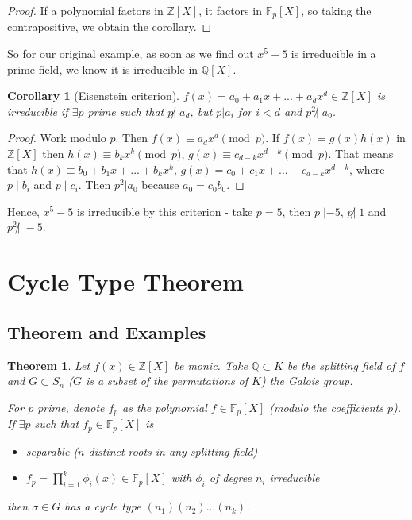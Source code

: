 \documentclass{article}
\theoremstyle{definition}
\theoremstyle{plain}%
\newtheorem{thm}{Theorem}[section]
\newtheorem*{cor}{Corollary}
\theoremstyle{remark}
\newcommand{\Q}{\mathbb{Q}}
\newcommand{\Z}{\mathbb{Z}}
\newcommand{\F}{\mathbb{F}}
\begin{document}
\begin{proof}
    If a polynomial factors in $\Z[X]$, it factors in $\F_p[X]$, so taking the contrapositive, we obtain the corollary.
\end{proof}

So for our original example, as soon as we find out $x^5 - 5$ is irreducible in a prime field, we know it is irreducible in $\Q[X]$.

\begin{cor}[Eisenstein criterion]
    $f(x) = a_0 + a_1 x + ... + a_d x^d \in \Z[X]$ is irreducible if $\exists p$ prime such that $p \not | \; a_d$, but $p | a_i$ for $i < d$ and $p^2 \not | \; a_0$.
\end{cor}

\begin{proof}
    Work modulo $p$. Then $f(x) \equiv a_d x^d \pmod p$. If $f(x) = g(x)h(x)$ in $\Z[X]$ then $h(x) \equiv b_kx^k \pmod p$, $g(x) \equiv c_{d-k} x^{d-k} \pmod p$. That means that $h(x) \equiv b_0 + b_1 x + ... + b_k x^k$, $g(x) = c_0 + c_1 x + ... + c_{d-k}x^{d-k}$, where $p \; | \; b_i$ and $p \; | \; c_i$. Then $p^2 | a_0$ because $a_0  = c_0b_0$.
\end{proof}

Hence, $x^5 - 5$ is irreducible by this criterion - take $p = 5$, then $p \; | -5$, $p \not | \; 1$ and $p^2 \not | \; -5$.

\section{Cycle Type Theorem}

\subsection{Theorem and Examples}

\begin{thm}
    Let $f(x) \in \Z[X]$ be monic. Take $\Q \subset K$ be the splitting field of $f$ and $G \subset S_n$ ($G$ is a subset of the permutations of $K$) the Galois group.
    
    For $p$ prime, denote $f_p$ as the polynomial $f \in \mathbb{F}_p[X]$ (modulo the coefficients $p$). If $\exists p$ such that $f_p \in \mathbb{F}_p[X]$ is
    \begin{itemize}
        \item separable ($n$ distinct roots in any splitting field)
        \item $f_p = \prod_{i=1}^k \phi_i (x) \in \mathbb{F}_p[X]$ with $\phi_i$ of degree $n_i$ irreducible
    \end{itemize}
    then $\sigma \in G$ has a cycle type $(n_1)(n_2)...(n_k)$.
\end{thm}
\end{document}
